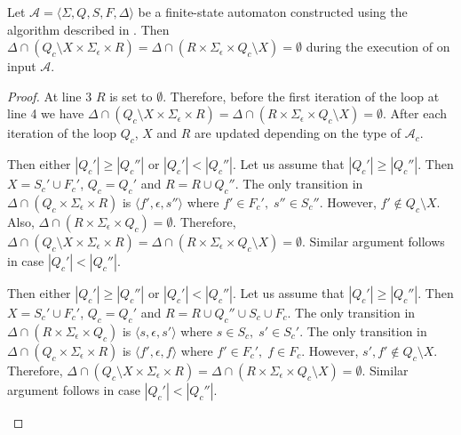 \begin{proposition}\label{prop:thompson_sep_6}
  Let $\mathcal{A} = \langle \Sigma, Q, S, F, \Delta \rangle$ be a finite-state
  automaton constructed using the algorithm described in . Then
  $\Delta \cap (Q_c \setminus X \times \Sigma_\epsilon \times R) = \Delta \cap (R
  \times \Sigma_\epsilon \times Q_c \setminus X) = \emptyset$ during the execution of
   on input $\mathcal{A}$.
\end{proposition}

\begin{proof}
  At line 3 $R$ is set to $\emptyset$. Therefore, before the first iteration
  of the loop at line 4 we have $\Delta \cap (Q_c \setminus X \times
    \Sigma_\epsilon \times R) = \Delta \cap (R \times \Sigma_\epsilon \times Q_c
    \setminus X) = \emptyset$. After each iteration of the loop $Q_c$, $X$ and
  $R$ are updated depending on the type of $\mathcal{A}_c$.

  \begin{case}
    Then either $|Q_c'| \geq |Q_c''|$ or $|Q_c'| < |Q_c''|$. Let us
    assume that $|Q_c'| \geq |Q_c''|$. Then $X = S_c' \cup F_c'$, $Q_c =
      Q_c'$ and $R = R \cup Q_c''$. The only transition in $\Delta \cap
      (Q_c \times \Sigma_\epsilon \times R)$ is $\langle f',
      \epsilon, s'' \rangle$ where $f' \in F_c', \; s'' \in S_c''$.
    However, $f' \not\in Q_c \setminus X$. Also, $\Delta \cap (R \times
      \Sigma_\epsilon \times Q_c) = \emptyset$. Therefore,
    $\Delta \cap (Q_c \setminus X \times \Sigma_\epsilon \times R) =
      \Delta \cap (R \times \Sigma_\epsilon \times Q_c \setminus X) =
      \emptyset$. Similar argument follows in case $|Q_c'| < |Q_c''|$.
  \end{case}

  \begin{case}
    Then either $|Q_c'| \geq |Q_c''|$ or $|Q_c'| < |Q_c''|$. Let us
    assume that $|Q_c'| \geq |Q_c''|$. Then $X = S_c' \cup F_c'$, $Q_c =
      Q_c'$ and $R = R \cup Q_c'' \cup S_c \cup F_c$. The only transition
    in $\Delta \cap (R \times \Sigma_\epsilon \times Q_c)$ is $\langle
      s, \epsilon, s' \rangle$ where $s \in S_c, \; s' \in S_c'$. The only
    transition in $\Delta \cap (Q_c \times \Sigma_\epsilon \times R)$ is
    $\langle f', \epsilon, f \rangle$ where $f' \in F_c', \; f \in F_c$.
    However, $s', f' \not\in Q_c \setminus X$. Therefore, $\Delta \cap
      (Q_c \setminus X \times \Sigma_\epsilon \times R) = \Delta \cap (R
      \times \Sigma_\epsilon \times Q_c \setminus X) = \emptyset$.
    Similar argument follows in case $|Q_c'| < |Q_c''|$.
  \end{case}


\end{proof}
